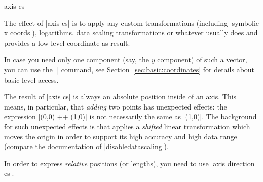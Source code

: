 \begin{coordinatesystem}{axis cs}
\begin{codeexample}[]
\end{codeexample}

    The effect of |axis cs| is to apply any custom transformations (including
    |symbolic x coords|), logarithms, data scaling transformations or whatever
    \PGFPlots{} usually does and provides a low level \pgfname{} coordinate as
    result.

    In case you need only one component (say, the $y$ component) of such a
    vector, you can use the |\pgfplotstransformcoordinatey| command, see
    Section~\ref{sec:basic:coordinates} for details about basic level access.

    The result of |axis cs| is always an absolute position inside of an axis.
    This means, in particular, that \emph{adding} two points has unexpected
    effects: the expression |(0,0) ++ (1,0)| is not necessarily the same as
    |(1,0)|. The background for such unexpected effects is that \PGFPlots{}
    applies a \emph{shifted} linear transformation which moves the origin in
    order to support its high accuracy and high data range (compare the
    documentation of |disabledatascaling|).

    In order to express \emph{relative} positions (or lengths), you need to use
    |axis direction cs|.
\end{coordinatesystem}

